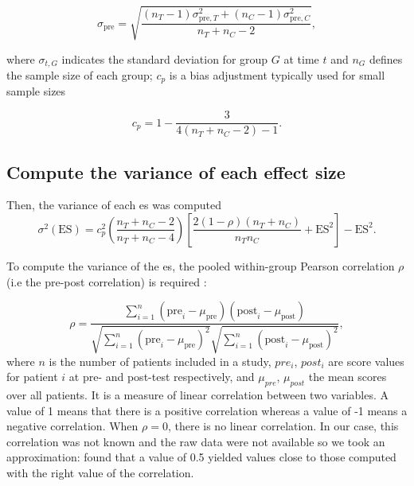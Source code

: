 \documentclass[12pt,a4paper,english]{article}
\begin{document}
\begin{equation}
\label{eq:stats_metareview_std_pre}
\sigma_{\text{pre}} = \sqrt{\frac{(n_T - 1)\sigma_{\text{pre},T}^2 + (n_C - 1)\sigma_{\text{pre},C}^2} {n_T + n_C - 2}},
\end{equation}

where $\sigma_{t,G}$ indicates the standard deviation for group $G$ at time $t$ and $n_G$ defines the sample size of each group; 
$c_p$ is a bias adjustment typically used for small sample sizes

\begin{equation}
\label{eq:metareview_correction_factor}
c_p =  1 - \frac{3} {4(n_T + n_C - 2) - 1}. 
\end{equation} 

\subsection{Compute the variance of each effect size}

Then, the variance of each \gls{es} was computed \citep{Morris2008}
\begin{equation}
\label{eq:metareview_variance_ES}
\sigma^2(\text{ES}) = c_p^2 \left (\frac{n_T + n_C - 2} {n_T + n_C - 4} \right ) \left  [ \frac{2(1-\rho)(n_T + n_C)} {n_Tn_C} + \text{ES}^2 \right ] - \text{ES}^2.
\end{equation} 

To compute the variance of the \gls{es}, the pooled within-group Pearson correlation $\rho$ (i.e the pre-post correlation) is required 
\citep{James2013}:

\begin{equation}
\label{eq:metareview_within_group_pearson_correlation}
\rho =  \frac{ \sum_{i=1}^{n} (\text{pre}_i - \mu_{\text{pre}})(\text{post}_i - \mu_{\text{post}}) } { \sqrt{ \sum_{i=1}^{n} (\text{pre}_i - \mu_{\text{pre}})^2} \sqrt{\sum_{i=1}^{n} (\text{post}_i - \mu_{\text{post}})^2} }, 
\end{equation}
where $n$ is the number of patients included in a study, $pre_i$, $post_i$ are score values for patient $i$ at pre- and post-test 
respectively, and $\mu_{pre}$, $\mu_{post}$ the mean scores over all patients. It is a measure of linear correlation between two variables. 
A value of 1 means that there is a positive correlation whereas a value of -1 means a negative correlation. When $\rho=0$, there is no
linear correlation. In our case, this correlation was not known and the raw data were not available so we took an
approximation: \citet{Balk2012} found that a value of 0.5 yielded values close to those computed with the right value of the correlation. 
\end{document}

